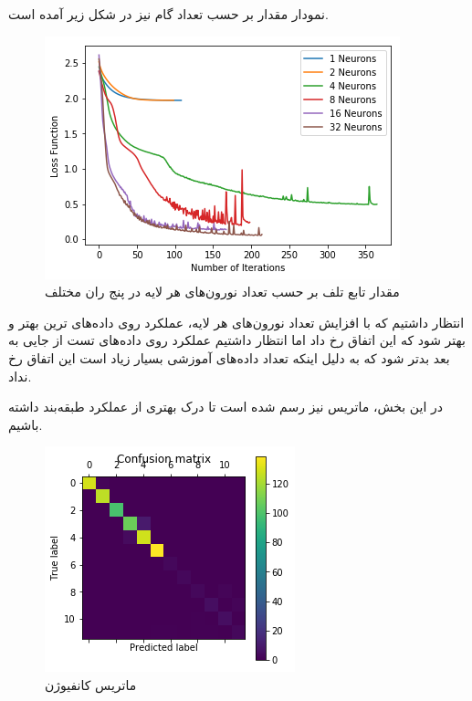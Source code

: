 \documentclass[a4paper]{article}
\begin{document}
\begin{large}
نمودار مقدار 
بر حسب تعداد گام نیز در شکل زیر آمده است.
\begin{figure}[h!]
	\centering
	\includegraphics[scale=0.7]{4.png}
	\caption{مقدار تابع تلف بر حسب تعداد نورون‌های هر لایه در پنج ران مختلف}
\end{figure}
انتظار داشتیم که با افزایش تعداد نورون‌های هر لایه‌، عملکرد روی داده‌های ترین بهتر و بهتر شود که این اتفاق رخ داد اما انتظار داشتیم عملکرد روی داده‌های تست از جایی به بعد بدتر شود که به دلیل اینکه تعداد داده‌های آموزشی بسیار زیاد است این اتفاق رخ نداد.

در این بخش، ماتریس 
نیز رسم شده است تا درک بهتری از عملکرد طبقه‌بند داشته باشیم.
\begin{figure}[h!]
	\centering
	\includegraphics[scale=0.7]{conf.png}
	\caption{ماتریس کانفیوژن}
\end{figure}
\newpage

\end{large}
\end{document}
